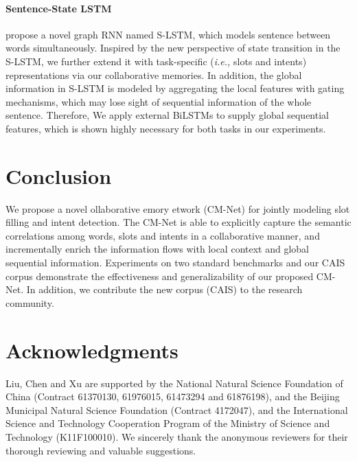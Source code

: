 \documentclass[11pt,a4paper]{article}
\begin{document}
\paragraph{Sentence-State LSTM}
\citeauthor{SLSTM_2018} \citeyear{SLSTM_2018} propose a novel graph RNN named S-LSTM, which models sentence between words simultaneously. Inspired by the new perspective of state transition in the S-LSTM, we further extend it with task-specific ({\em i.e., } slots and intents) representations via our collaborative memories. In addition, the global information in S-LSTM is modeled by aggregating the local features with gating mechanisms, which may lose sight of sequential information of the whole sentence. Therefore, We apply external BiLSTMs to supply global sequential features, which is shown highly necessary for both tasks in our experiments.

\section{Conclusion}
We propose a novel ollaborative emory etwork (CM-Net) for jointly modeling slot filling and intent detection. The CM-Net is able to explicitly capture the semantic correlations among words, slots and intents in a collaborative manner, and incrementally enrich the information flows with local context and global sequential information.
Experiments on two standard benchmarks and our CAIS corpus demonstrate the effectiveness and generalizability of our proposed CM-Net. In addition, we contribute the new corpus (CAIS) to the research community.



\section*{Acknowledgments}
Liu, Chen and Xu are supported by the National Natural Science Foundation of China (Contract 61370130, 61976015, 61473294 and 61876198), and the Beijing Municipal Natural Science Foundation (Contract 4172047), and the International Science and Technology Cooperation Program of the Ministry of Science and Technology (K11F100010). We sincerely thank the anonymous reviewers for their thorough reviewing and valuable suggestions.






\appendix
\end{document}
